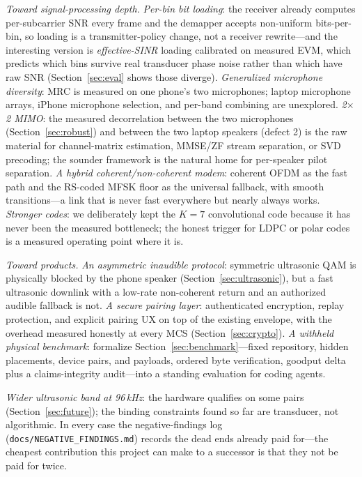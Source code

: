 \documentclass[11pt]{article}
\begin{document}
\emph{Toward signal-processing depth.} \emph{Per-bin bit loading}: the
receiver already computes per-subcarrier SNR every frame and the demapper
accepts non-uniform bits-per-bin, so loading is a transmitter-policy change,
not a receiver rewrite---and the interesting version is
\emph{effective-SINR} loading calibrated on measured EVM, which predicts
which bins survive real transducer phase noise rather than which have raw
SNR (Section~\ref{sec:eval} shows those diverge). \emph{Generalized
microphone diversity}: MRC is measured on one phone's two microphones;
laptop microphone arrays, iPhone microphone selection, and per-band
combining are unexplored. \emph{2$\times$2 MIMO}: the measured decorrelation
between the two microphones (Section~\ref{sec:robust}) and between the two
laptop speakers (defect 2) is the raw material for channel-matrix
estimation, MMSE/ZF stream separation, or SVD precoding; the sounder
framework is the natural home for per-speaker pilot separation.
\emph{A hybrid coherent/non-coherent modem}: coherent OFDM as the fast path
and the RS-coded MFSK floor as the universal fallback, with smooth
transitions---a link that is never fast everywhere but nearly always works.
\emph{Stronger codes}: we deliberately kept the $K{=}7$ convolutional code
because it has never been the measured bottleneck; the honest trigger for
LDPC or polar codes is a measured operating point where it is.

\emph{Toward products.} \emph{An asymmetric inaudible protocol}: symmetric
ultrasonic QAM is physically blocked by the phone speaker
(Section~\ref{sec:ultrasonic}), but a fast ultrasonic downlink with a
low-rate non-coherent return and an authorized audible fallback is not.
\emph{A secure pairing layer}: authenticated encryption, replay protection,
and explicit pairing UX on top of the existing envelope, with the overhead
measured honestly at every MCS (Section~\ref{sec:crypto}). \emph{A withheld
physical benchmark}: formalize Section~\ref{sec:benchmark}---fixed repository,
hidden placements, device pairs, and payloads, ordered byte verification,
goodput delta plus a claims-integrity audit---into a standing evaluation for
coding agents.

\emph{Wider ultrasonic band at 96\,kHz}: the hardware qualifies on some
pairs (Section~\ref{sec:future}); the binding constraints found so far are
transducer, not algorithmic. In every case the negative-findings log
(\texttt{docs/NEGATIVE\_FINDINGS.md}) records the dead ends already paid
for---the cheapest contribution this project can make to a successor is that
they not be paid for twice.
\end{document}
